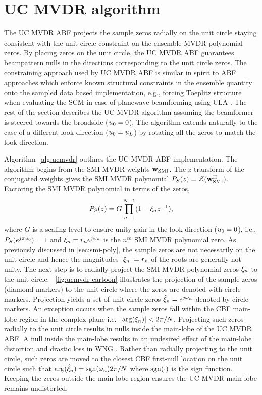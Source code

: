 \section{UC MVDR algorithm}
\label{sec:ucmvdr-algorithm}
The UC MVDR ABF projects the sample zeros radially on the
unit circle staying consistent with the unit circle constraint on the
ensemble MVDR polynomial zeros. By placing zeros on the unit circle,
the UC MVDR ABF guarantees beampattern nulls in the directions
corresponding to the unit circle zeros. The constraining approach used
by UC MVDR ABF is similar in spirit to ABF approaches which enforce
known structural constraints in the ensemble quantity onto the sampled
data based implementation, e.g., forcing Toeplitz structure when
evaluating the SCM in case of planewave beamforming using ULA
\cite{fuhrmann1991toeplitz}. The rest of the section describes the UC
MVDR algorithm assuming the beamformer is steered towards the
broadside ($u_0 = 0$). The algorithm extends naturally to the case
of a different look direction ($u_0 = u_L$) by rotating all the
zeros to match the look direction.

Algorithm~\ref{alg:ucmvdr} outlines the UC MVDR ABF
implementation. The algorithm begins from the SMI MVDR weights
${\bf w}_{\rm SMI}$. The $z$-transform of the conjugated weights gives the SMI
MVDR polynomial $P_S(z) = \mathcal{Z}{({\bf w}_{\rm SMI}^{\rm H})}$. Factoring the SMI
MVDR polynomial in terms of the zeros,
\[
P_S(z) = G \prod\limits_{n=1}^{N-1}(1 - \xi_n z^{-1}),  
\]
where $G$ is a scaling level to ensure unity gain in the look
direction ($u_0 = 0$), i.e., $P_S(e^{j\pi u_0}) = 1$ and $\xi_n = r_ne^{j\omega_n}$ is the $n^{th}$ SMI MVDR
polynomial zero. As previously discussed in \sect{}\ref{sec:smi-poly},
the sample zeros are not necessarily on the unit circle
and hence the magnitudes $|\xi_n| = r_n$ of the roots are generally
not unity. The next step is to radially project the SMI MVDR
polynomial zeros $\xi_n$ to the unit circle. \figurename{}~\ref{fig:ucmvdr-cartoon} illustrates the projection of the sample zeros (diamond markers) to the unit circle where the zeros are denoted with circle markers. Projection yields a
set of unit circle zeros $\hat{\xi}_n = e^{j\omega_n}$ denoted by circle
markers. An exception occurs when the sample zeros fall within the CBF
main-lobe region in the complex plane
i.e. $|\operatorname{arg}(\xi_n)|<2\pi/N$. Projecting such
zeros radially to the unit circle results in nulls inside the
main-lobe of the UC MVDR ABF. A null inside the main-lobe results in
an undesired effect of the main-lobe distortion and drastic loss in
WNG \cite[Sec.~6.3.1]{vtree2002oap}. Rather than radially projecting
to the unit circle, such zeros are moved to the closest CBF
first-null location on the unit circle such that
$\operatorname{arg}(\hat{\xi}_n) = {\operatorname{sgn}}(\omega_n){2\pi/N}$ where
${\operatorname{sgn}}(\cdot)$ is the sign function. Keeping the zeros outside the
main-lobe region ensures the UC MVDR main-lobe remains undistorted.

